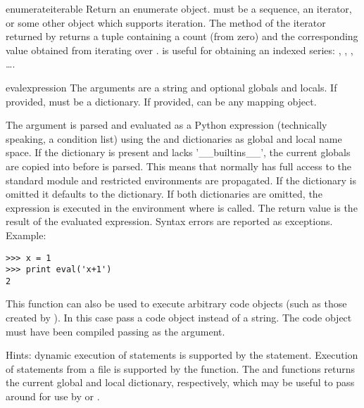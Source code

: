 \begin{funcdesc}{enumerate}{iterable}
  Return an enumerate object.  must be a sequence, an
  iterator, or some other object which supports iteration.  The
   method of the iterator returned by
   returns a tuple containing a count (from
  zero) and the corresponding value obtained from iterating over
  .   is useful for obtaining an
  indexed series: , , , \ldots.
\end{funcdesc}

\begin{funcdesc}{eval}{expression}
  The arguments are a string and optional globals and locals.  If provided,
   must be a dictionary.  If provided,  can be
  any mapping object.  

  The  argument is parsed and evaluated as a Python
  expression (technically speaking, a condition list) using the
   and  dictionaries as global and local name
  space.  If the  dictionary is present and lacks
  '__builtins__', the current globals are copied into  before
   is parsed.  This means that 
  normally has full access to the standard
   module and restricted environments
  are propagated.  If the  dictionary is omitted it defaults to
  the  dictionary.  If both dictionaries are omitted, the
  expression is executed in the environment where  is
  called.  The return value is the result of the evaluated expression.
  Syntax errors are reported as exceptions.  Example:

\begin{verbatim}
>>> x = 1
>>> print eval('x+1')
2
\end{verbatim}

  This function can also be used to execute arbitrary code objects
  (such as those created by ).  In this case pass
  a code object instead of a string.  The code object must have been
  compiled passing  as the  argument.

  Hints: dynamic execution of statements is supported by the
   statement.  Execution of statements from a file is
  supported by the  function.  The
   and  functions returns the
  current global and local dictionary, respectively, which may be
  useful to pass around for use by  or
  .
\end{funcdesc}

